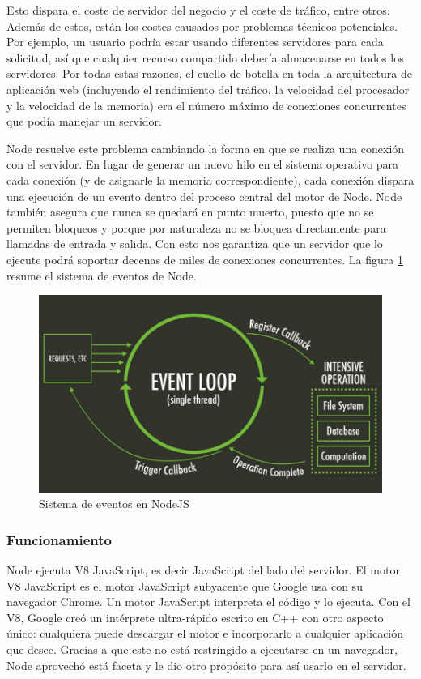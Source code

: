 Esto dispara el coste de servidor del negocio y el coste de tráfico, entre otros. Además de estos, están los costes causados por problemas técnicos potenciales. Por ejemplo, un usuario podría estar usando diferentes servidores para cada solicitud, así que cualquier recurso compartido debería almacenarse en todos los servidores. Por todas estas razones, el cuello de botella en toda la arquitectura de aplicación web (incluyendo el rendimiento del tráfico, la velocidad del procesador y la velocidad de la memoria) era el número máximo de conexiones concurrentes que podía manejar un servidor.

Node resuelve este problema cambiando la forma en que se realiza una conexión con el servidor. En lugar de generar un nuevo hilo en el sistema operativo para cada conexión (y de asignarle la memoria correspondiente), cada conexión dispara una ejecución de un evento dentro del proceso central del motor de Node. Node también asegura que nunca se quedará en punto muerto, puesto que no se permiten bloqueos y porque por naturaleza no se bloquea directamente para llamadas de entrada y salida. Con esto nos garantiza que un servidor que lo ejecute podrá soportar decenas de miles de conexiones concurrentes. La figura \ref{fig:nodeEvent} resume el sistema de eventos de Node.
\begin{figure}[h] \centering
\includegraphics[width=15cm]{graphs/node_eventloop.png} \caption{Sistema de eventos en NodeJS \cite{nodejs}}
\label{fig:nodeEvent}
\end{figure}

\subsubsection{Funcionamiento}
Node ejecuta V8 JavaScript, es decir JavaScript del lado del servidor. El motor V8 JavaScript es el motor JavaScript subyacente que Google usa con su navegador Chrome. Un motor JavaScript interpreta el código y lo ejecuta. Con el V8, Google creó un intérprete ultra-rápido escrito en C++ con otro aspecto único: cualquiera puede descargar el motor e incorporarlo a cualquier aplicación que desee. Gracias a que este no está restringido a ejecutarse en un navegador, Node aprovechó está faceta y le dio otro propósito para así usarlo en el servidor.

